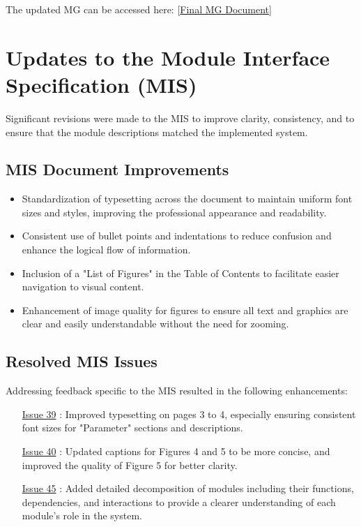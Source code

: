 \documentclass[12pt]{article}
\begin{document}
The updated MG can be accessed here:
[\href{https://github.com/XessX/Angry_Bird_Alike/blob/main/docs/Design/SoftArchitecture/MG.pdf}{Final MG Document}]

\section{Updates to the Module Interface Specification (MIS)}
Significant revisions were made to the MIS to improve clarity, consistency, and to ensure that the module descriptions matched the implemented system.

\subsection{MIS Document Improvements}
\begin{itemize}
    \item Standardization of typesetting across the document to maintain uniform font sizes and styles, improving the professional appearance and readability.
    \item Consistent use of bullet points and indentations to reduce confusion and enhance the logical flow of information.
    \item Inclusion of a "List of Figures" in the Table of Contents to facilitate easier navigation to visual content.
    \item Enhancement of image quality for figures to ensure all text and graphics are clear and easily understandable without the need for zooming.
\end{itemize}

\subsection{Resolved MIS Issues}
Addressing feedback specific to the MIS resulted in the following enhancements:
\begin{itemize}
    \item [\href{https://github.com/XessX/Angry_Bird_Alike/issues/39}{Issue 39}]: Improved typesetting on pages 3 to 4, especially ensuring consistent font sizes for "Parameter" sections and descriptions.
    \item [\href{https://github.com/XessX/Angry_Bird_Alike/issues/40}{Issue 40}]: Updated captions for Figures 4 and 5 to be more concise, and improved the quality of Figure 5 for better clarity.
    \item [\href{https://github.com/XessX/Angry_Bird_Alike/issues/45}{Issue 45}]: Added detailed decomposition of modules including their functions, dependencies, and interactions to provide a clearer understanding of each module's role in the system.
\end{itemize}
\end{document}
